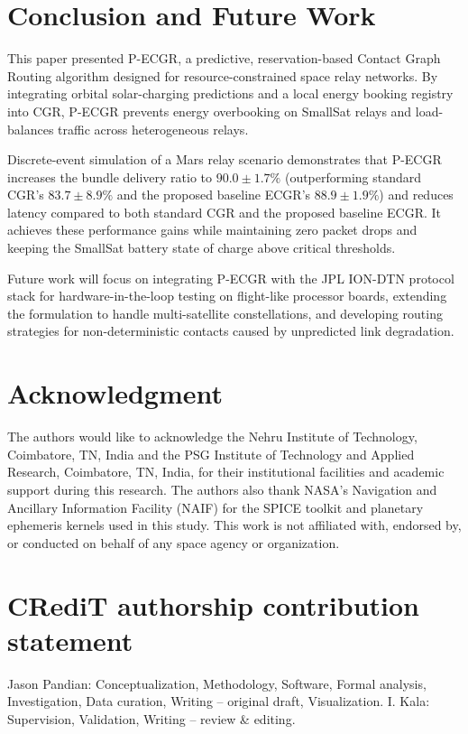 \documentclass[a4paper,fleqn]{cas-dc}
\newcommand{\ecgr}{\textsf{ECGR}}
\newcommand{\pecgr}{\textsf{P-ECGR}}
\begin{document}
\section{Conclusion and Future Work}
\label{sec:conclusion}

This paper presented \pecgr{}, a predictive, reservation-based Contact Graph Routing algorithm designed for resource-constrained space relay networks. By integrating orbital solar-charging predictions and a local energy booking registry into CGR, \pecgr{} prevents energy overbooking on SmallSat relays and load-balances traffic across heterogeneous relays.

Discrete-event simulation of a Mars relay scenario demonstrates that \pecgr{} increases the bundle delivery ratio to $90.0 \pm 1.7\%$ (outperforming standard CGR's $83.7 \pm 8.9\%$ and the proposed baseline \ecgr{}'s $88.9 \pm 1.9\%$) and reduces latency compared to both standard CGR and the proposed baseline \ecgr{}. It achieves these performance gains while maintaining zero packet drops and keeping the SmallSat battery state of charge above critical thresholds.

Future work will focus on integrating \pecgr{} with the JPL ION-DTN protocol stack for hardware-in-the-loop testing on flight-like processor boards, extending the formulation to handle multi-satellite constellations, and developing routing strategies for non-deterministic contacts caused by unpredicted link degradation.

\section*{Acknowledgment}
The authors would like to acknowledge the Nehru Institute of Technology, Coimbatore, TN, India and the PSG Institute of Technology and Applied Research, Coimbatore, TN, India, for their institutional facilities and academic support during this research. The authors also thank NASA's Navigation and Ancillary Information Facility (NAIF) for the SPICE toolkit and planetary ephemeris kernels used in this study.
This work is not affiliated with, endorsed by, or conducted on behalf of any space agency or organization.

\section*{CRediT authorship contribution statement}
Jason Pandian: Conceptualization, Methodology, Software, Formal analysis, Investigation, Data curation, Writing -- original draft, Visualization. I. Kala: Supervision, Validation, Writing -- review \& editing.
\end{document}
